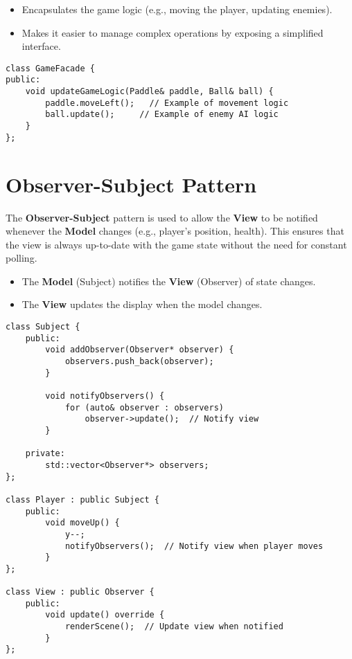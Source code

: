 \documentclass{article}
\begin{document}
\begin{itemize}
    \item Encapsulates the game logic (e.g., moving the player, updating enemies).
    \item Makes it easier to manage complex operations by exposing a simplified interface.
\end{itemize}

\begin{center}
    \begin{minipage}[c]{0.5\textwidth}
        \begin{verbatim}
class GameFacade {
public:
    void updateGameLogic(Paddle& paddle, Ball& ball) {
        paddle.moveLeft();   // Example of movement logic
        ball.update();     // Example of enemy AI logic
    }
};
        \end{verbatim}
    \end{minipage}
\end{center}

\section{Observer-Subject Pattern}
The \textbf{Observer-Subject} pattern is used to allow the \textbf{View} to be notified whenever the \textbf{Model} changes (e.g., player’s position, health). This ensures that the view is always up-to-date with the game state without the need for constant polling.

\begin{itemize}
    \item The \textbf{Model} (Subject) notifies the \textbf{View} (Observer) of state changes.
    \item The \textbf{View} updates the display when the model changes.
\end{itemize}

\begin{center}
    \begin{minipage}[c]{0.5\textwidth}
        \begin{verbatim}
class Subject {
    public:
        void addObserver(Observer* observer) {
            observers.push_back(observer);
        }

        void notifyObservers() {
            for (auto& observer : observers)
                observer->update();  // Notify view
        }

    private:
        std::vector<Observer*> observers;
};

class Player : public Subject {
    public:
        void moveUp() {
            y--;
            notifyObservers();  // Notify view when player moves
        }
};

class View : public Observer {
    public:
        void update() override {
            renderScene();  // Update view when notified
        }
};
        \end{verbatim}
    \end{minipage}
\end{center}
\end{document}

